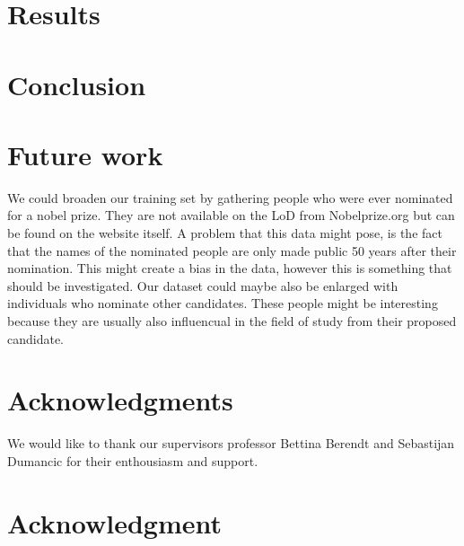 \documentclass[11pt,journal,compsoc]{IEEEtran}
\begin{document}




\section{Results}
\label{sec:results}

\section{Conclusion}

\section{Future work}

We could broaden our training set by gathering people who were ever nominated for a nobel prize. They are not available on the LoD from Nobelprize.org but can be found on the website itself\cite{nominated}. A problem that this data might pose, is the fact that the names of the nominated people are only made public 50 years after their nomination.
This might create a bias in the data, however this is something that should be investigated.
Our dataset could maybe also be enlarged with individuals who nominate other candidates. These people might be interesting because they are usually also influencual in the field of study from their proposed candidate.



\ifCLASSOPTIONcompsoc
  \section*{Acknowledgments}
  We would like to thank our supervisors professor Bettina Berendt and Sebastijan Dumancic for their enthousiasm and support.
\else
  \section*{Acknowledgment}
\fi

\end{document}
